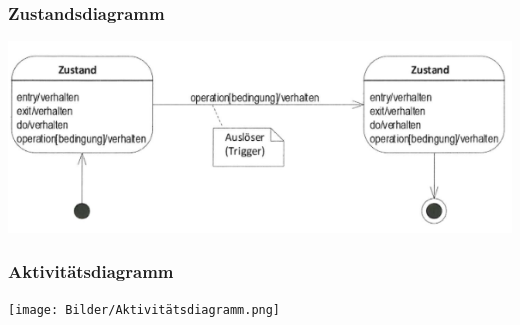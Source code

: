 \subsubsection{Zustandsdiagramm}
\label{sec:Zustandsdiagramm}

\begin{center}
	\includegraphics[scale=.9]{Bilder/Zustandsdiagramm.png}
\end{center}

\subsubsection{Aktivitätsdiagramm}
\label{sec:Aktivitaetsdiagramm}

\begin{center}
	\texttt{[image: Bilder/Aktivitätsdiagramm.png]}
\end{center}

